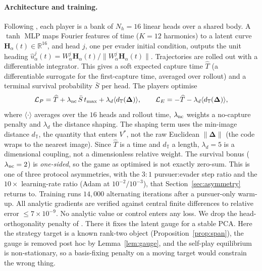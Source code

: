 \documentclass[twoside,11pt]{article}
\newcommand{\Dl}{\bm{\Delta}}
\newcommand{\HH}{\bm{H}}
\newcommand{\RR}{\mathbb{R}}
\begin{document}
\paragraph{Architecture and training.}  Following
\citet{JimenezEmbeddings2026}, each player is a bank of $N_h = 16$
linear heads over a shared body.  A $\tanh$ MLP maps Fourier features
of time ($K = 12$ harmonics) to a latent curve
$\HH_\alpha(t) \in \RR^{16}$, and head $j$, one per evader initial
condition, outputs the unit heading
$\hat u^{j}_\alpha(t) = W^{j}_\alpha \HH_\alpha(t) /
\|W^{j}_\alpha \HH_\alpha(t)\|$.  Trajectories are rolled out with a
differentiable integrator.  This gives a soft expected capture time
$\widehat{T}$ (a differentiable surrogate for the first-capture time,
averaged over rollout) and a terminal survival probability $\bar S$
per head.  The players optimise
\begin{equation}
\mathcal{L}_P
 = \widehat{T} + \lambda_{\rm nc}\,\bar S\, t_{\max}
 + \lambda_d \langle d_{\mathbb{T}}(\Dl) \rangle,
\qquad
\mathcal{L}_E
 = -\widehat{T} - \lambda_d \langle d_{\mathbb{T}}(\Dl) \rangle,
\label{eq:losses}
\end{equation}
where $\langle\cdot\rangle$ averages over the $16$ heads and rollout
time, $\lambda_{\rm nc}$ weights a no-capture penalty and $\lambda_d$
the distance shaping.  The shaping term uses the min-image distance
$d_{\mathbb{T}}$, the quantity that enters $V^{*}$, not the raw
Euclidean $\|\Dl\|$ (the code wraps to the nearest image).  Since
$\widehat{T}$ is a time and $d_{\mathbb{T}}$ a length, $\lambda_d = 5$
is a dimensional coupling, not a dimensionless relative weight.  The
survival bonus ($\lambda_{\rm nc} = 2$) is \emph{one-sided}, so the
game as optimised is not exactly zero-sum.  This is one of three
protocol asymmetries, with the $3\!:\!1$ pursuer:evader step ratio and
the $10\times$ learning-rate ratio (Adam at $10^{-2}/10^{-3}$), that
Section~\ref{sec:asymmetry} returns to.  Training runs $14{,}000$
alternating iterations after a pursuer-only warm-up.  All analytic
gradients are verified against central finite differences to relative
error $\le 7\times10^{-9}$.  No analytic value or control enters any
loss.  We drop the head-orthogonality penalty of
\citet{JimenezEmbeddings2026}.  There it fixes the latent gauge for a
stable PCA.  Here the strategy target is a known rank-two object
(Proposition~\ref{prop:span}), the gauge is removed post hoc by
Lemma~\ref{lem:gauge}, and the self-play equilibrium is
non-stationary, so a basis-fixing penalty on a moving target would
constrain the wrong thing.
\end{document}
